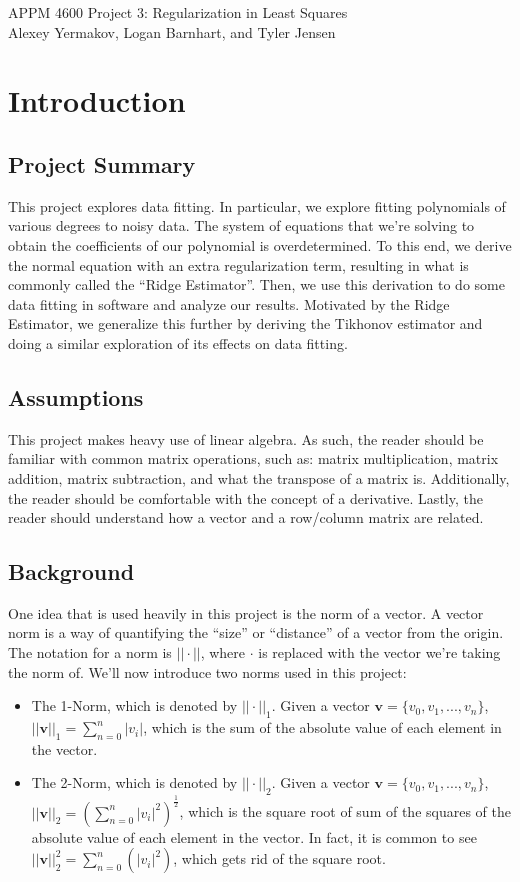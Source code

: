 \documentclass{article}
\newcommand{\V}{\mathbf{v}} %
\begin{document}
 
APPM 4600 Project 3: Regularization in Least Squares\\
Alexey Yermakov, Logan Barnhart, and Tyler Jensen

\section{Introduction}
\subsection{Project Summary}

This project explores data fitting. In particular, we explore fitting polynomials of various degrees to noisy data. The system of equations that we're solving to obtain the coefficients of our polynomial is overdetermined. To this end, we derive the normal equation with an extra regularization term, resulting in what is commonly called the ``Ridge Estimator''. Then, we use this derivation to do some data fitting in software and analyze our results. Motivated by the Ridge Estimator, we generalize this further by deriving the Tikhonov estimator and doing a similar exploration of its effects on data fitting.

\subsection{Assumptions}

This project makes heavy use of linear algebra. As such, the reader should be familiar with common matrix operations, such as: matrix multiplication, matrix addition, matrix subtraction, and what the transpose of a matrix is. Additionally, the reader should be comfortable with the concept of a derivative. Lastly, the reader should understand how a vector and a row/column matrix are related.

\subsection{Background}

One idea that is used heavily in this project is the norm of a vector. A vector norm is a way of quantifying the ``size'' or ``distance'' of a vector from the origin. The notation for a norm is $||\cdot||$, where $\cdot$ is replaced with the vector we're taking the norm of. We'll now introduce two norms used in this project:

\begin{itemize}
    \item The 1-Norm, which is denoted by $||\cdot||_1$. Given a vector $\V=\{v_0,v_1,...,v_n\}$, $||\V||_1=\sum_{n=0}^{n}|v_i|$, which is the sum of the absolute value of each element in the vector.
    \item The 2-Norm, which is denoted by $||\cdot||_2$. Given a vector $\V=\{v_0,v_1,...,v_n\}$, $||\V||_2=\left(\sum_{n=0}^{n}|v_i|^2\right)^{\frac{1}{2}}$, which is the square root of sum of the squares of the absolute value of each element in the vector. In fact, it is common to see $||\V||_2^{2}=\sum_{n=0}^{n}(|v_i|^2)$, which gets rid of the square root.
\end{itemize}
\end{document}
